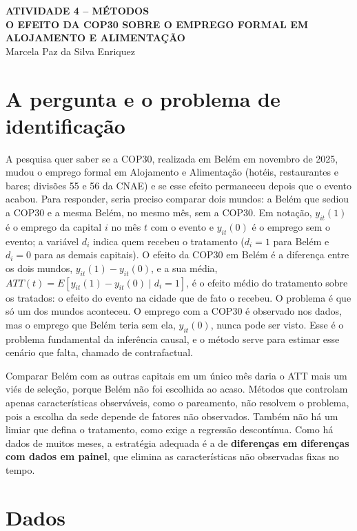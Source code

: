 \documentclass[12pt,a4paper]{article}
\begin{document}
\begin{center}
  {\bfseries ATIVIDADE 4 -- MÉTODOS\\
  O EFEITO DA COP30 SOBRE O EMPREGO FORMAL EM ALOJAMENTO E ALIMENTAÇÃO}\\[4pt]
  Marcela Paz da Silva Enriquez
\end{center}

\section{A pergunta e o problema de identificação}

A pesquisa quer saber se a COP30, realizada em Belém em novembro de 2025, mudou o emprego formal
em Alojamento e Alimentação (hotéis, restaurantes e bares; divisões 55 e 56 da CNAE) e se esse efeito
permaneceu depois que o evento acabou. Para responder, seria preciso comparar dois mundos: a Belém que
sediou a COP30 e a mesma Belém, no mesmo mês, sem a COP30. Em notação, $y_{it}(1)$ é o emprego da
capital $i$ no mês $t$ com o evento e $y_{it}(0)$ é o emprego sem o evento; a variável $d_i$ indica
quem recebeu o tratamento ($d_i = 1$ para Belém e $d_i = 0$ para as demais capitais). O efeito da COP30
em Belém é a diferença entre os dois mundos, $y_{it}(1) - y_{it}(0)$, e a sua média,
$ATT(t) = E[y_{it}(1) - y_{it}(0) \mid d_i = 1]$, é o efeito médio do tratamento sobre os tratados: o
efeito do evento na cidade que de fato o recebeu. O problema é que só um dos mundos aconteceu. O
emprego com a COP30 é observado nos dados, mas o emprego que Belém teria sem ela, $y_{it}(0)$, nunca
pode ser visto. Esse é o problema fundamental da inferência causal, e o método serve para estimar esse
cenário que falta, chamado de contrafactual.

Comparar Belém com as outras capitais em um único mês daria o ATT mais um viés de seleção, porque
Belém não foi escolhida ao acaso. Métodos que controlam apenas características observáveis, como o
pareamento, não resolvem o problema, pois a escolha da sede depende de fatores não observados.
Também não há um limiar que defina o tratamento, como
exige a regressão descontínua. Como há dados de muitos meses, a estratégia adequada é a de \textbf{diferenças em diferenças com dados em painel}, que elimina as características
não observadas fixas no tempo.

\section{Dados}
\end{document}
